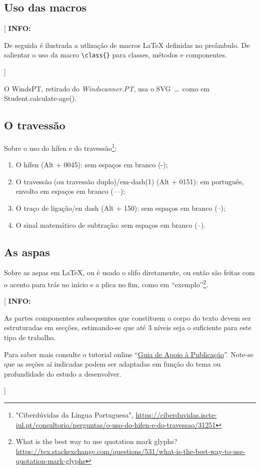 \documentclass[11pt,a4paper]{report}
\newcommand{\windspt}{\textsf{WindsPT\/}}
\newcommand{\windscannerpt}{\emph{Windscanner.PT\/}}
\newcommand{\class}[1]{{\normalfont\sffamily #1\/}}
\newcommand{\svg}{\class{SVG}}
\newenvironment{info}[1]{\vspace*{6mm}\color{blue}[ \textbf{INFO:} \begin{em} #1}
                        {\vspace*{3mm}\end{em} ]}
\begin{document}
\subsection*{Uso das macros}

\begin{info}
De seguida é ilustrada a utlização de macros \LaTeX{} definidas no
preâmbulo.
De salientar o uso da macro \verb!\class{}! para classes, métodos e componentes.
\end{info}

O \windspt, retirado do \windscannerpt, usa o \svg\ \ldots\ como em \class{Student.calculate-age()}.

\lipsum[9]

\subsection*{O travessão}

Sobre o uso do hífen e do travessão\footnote{"Ciberdúvidas da Língua Portuguesa", \url{https://ciberduvidas.iscte-iul.pt/consultorio/perguntas/o-uso-do-hifen-e-do-travessao/31251}}: 
\begin{enumerate}
    \item O hífen (Alt + 0045): sem espaços em branco (-);
    \item O travessão (ou travessão duplo)/em-dash(1) (Alt + 0151): em português, envolto em espaços em branco (---);
    \item O traço de ligação/en dash (Alt + 150): sem espaços em branco (--);
    \item O sinal matemático de subtração: sem espaços em branco (–).
\end{enumerate}

\subsection*{As aspas}

Sobre as aspas  em \LaTeX, ou é usado o slifo diretamente, ou então são feitas com o acento para trás no início e a plica no fim, como em ``exemplo''\footnote{What is the best way to use quotation mark glyphs? 
\url{https://tex.stackexchange.com/questions/531/what-is-the-best-way-to-use-quotation-mark-glyphs}}.


\begin{info}
As partes componentes subsequentes que constituem o corpo do texto
devem ser estruturadas em secções, estimando-se que até 3 níveis seja
o suficiente para este tipo de trabalho.

Para saber mais consulte o tutorial online 
``\href{https://docs.google.com/document/d/1TDC1behVq8x7fQL4CcPEEh_np5GXviJevQxnQ9gbiJs/edit}
{Guia de Apoio à Publicação}''.
Note-se que as seções aí indicadas podem ser adaptadas em função do tema
ou profundidade do estudo a desenvolver.
\end{info}
\end{document}
